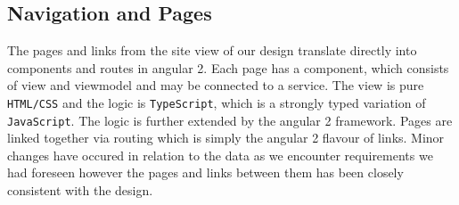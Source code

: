 \documentclass[10pt,a4paper]{report}
\begin{document}
\subsection{Navigation and Pages}
The pages and links from the site view of our design translate directly into components and routes in angular 2. Each page has a component, which consists of view and viewmodel and may be connected to a service. The view is pure \texttt{HTML/CSS} and the logic is \texttt{TypeScript}, which is a strongly typed variation of \texttt{JavaScript}. The logic is further extended by the angular 2 framework. Pages are linked together via routing which is simply the angular 2 flavour of links. Minor changes have occured in relation to the data as we encounter requirements we had foreseen however the pages and links between them has been closely consistent with the design. 
\end{document}

